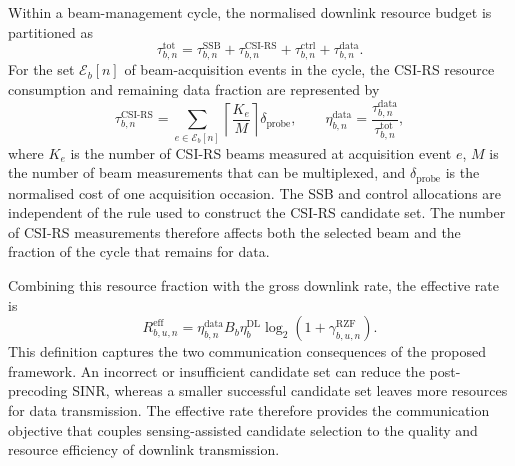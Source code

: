 Within a beam-management cycle, the normalised downlink resource budget is
partitioned as
\begin{equation}
    \tau_{b,n}^{\mathrm{tot}}
    =
    \tau_{b,n}^{\mathrm{SSB}}
    +\tau_{b,n}^{\mathrm{CSI\text{-}RS}}
    +\tau_{b,n}^{\mathrm{ctrl}}
    +\tau_{b,n}^{\mathrm{data}}.
    \label{eq:system-resource-budget}
\end{equation}
For the set \(\mathcal{E}_b[n]\) of beam-acquisition events in the cycle, the
CSI-RS resource consumption and remaining data fraction are represented by
\begin{equation}
    \tau_{b,n}^{\mathrm{CSI\text{-}RS}}
    =
    \sum_{e\in\mathcal{E}_b[n]}
    \left\lceil\frac{K_e}{M}\right\rceil\delta_{\mathrm{probe}},
    \qquad
    \eta_{b,n}^{\mathrm{data}}
    =
    \frac{\tau_{b,n}^{\mathrm{data}}}{\tau_{b,n}^{\mathrm{tot}}},
    \label{eq:system-csirs-overhead}
\end{equation}
where \(K_e\) is the number of CSI-RS beams measured at acquisition event
\(e\), \(M\) is the number of beam measurements that can be multiplexed, and
\(\delta_{\mathrm{probe}}\) is the normalised cost of one acquisition
occasion.  The SSB and control allocations are independent of the rule used to
construct the CSI-RS candidate set.  The number of CSI-RS measurements
therefore affects both the selected beam and the fraction of the cycle that
remains for data.

Combining this resource fraction with the gross downlink rate, the effective
rate is
\begin{equation}
    R_{b,u,n}^{\mathrm{eff}}
    =
    \eta_{b,n}^{\mathrm{data}}
    B_b\eta_b^{\mathrm{DL}}
    \log_2\!\left(1+\gamma_{b,u,n}^{\mathrm{RZF}}\right).
    \label{eq:system-effective-rate}
\end{equation}
This definition captures the two communication consequences of the proposed
framework.  An incorrect or insufficient candidate set can reduce the
post-precoding SINR, whereas a smaller successful candidate set leaves more
resources for data transmission.  The effective rate therefore provides the
communication objective that couples sensing-assisted candidate selection to
the quality and resource efficiency of downlink transmission.
